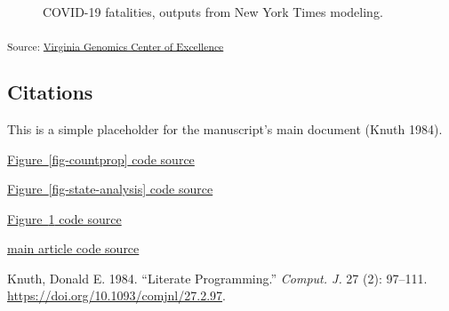 \documentclass[
  twocolumn]{article}
\newlength{\cslhangindent}
\newenvironment{CSLReferences}[2] %
 {\begin{list}{}{%
  \setlength{\itemindent}{0pt}
  \setlength{\leftmargin}{0pt}
  \setlength{\parsep}{0pt}
  \ifodd #1
   \setlength{\leftmargin}{\cslhangindent}
   \setlength{\itemindent}{-1\cslhangindent}
  \fi
  \setlength{\itemsep}{#2\baselineskip}}}
 {\end{list}}
\begin{document}
\begin{figure}[H]


\caption{\label{fig-fatality-plot}COVID-19 fatalities, outputs from New
York Times modeling.}

\end{figure}%

\textsubscript{Source:
\href{https://coe-test-org.github.io/sitrep-demo/notebooks/vacoe-preview.html\#cell-fig-fatality-plot}{Virginia
Genomics Center of Excellence}}

\subsection{Citations}\label{citations}

This is a simple placeholder for the manuscript's main document (Knuth
1984).

\href{https://coe-test-org.github.io/sitrep-demo/notebooks/nwcoe-preview.html\#cell-fig-countprop}{Figure~\ref{fig-countprop}
code source}

\href{https://coe-test-org.github.io/sitrep-demo/notebooks/necoe-preview.html\#cell-fig-state-analysis}{Figure~\ref{fig-state-analysis}
code source}

\href{https://coe-test-org.github.io/sitrep-demo/notebooks/vacoe-preview.html\#cell-fig-fatality-plot}{Figure~\ref{fig-fatality-plot}
code source}

\href{https://coe-test-org.github.io/sitrep-demo/index-preview.html}{main
article code source}

\label{refs}
\begin{CSLReferences}{1}{0}
Knuth, Donald E. 1984. {``Literate Programming.''} \emph{Comput. J.} 27
(2): 97--111. \url{https://doi.org/10.1093/comjnl/27.2.97}.

\end{CSLReferences}
\end{document}
